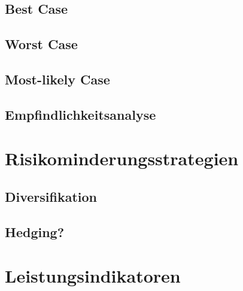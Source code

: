         \subsection{Best Case}

        \subsection{Worst Case}

        \subsection{Most-likely Case}

        \subsection{Empfindlichkeitsanalyse}

    \section{Risikominderungsstrategien}

        \subsection{Diversifikation}

        \subsection{Hedging?}

    \section{Leistungsindikatoren}
